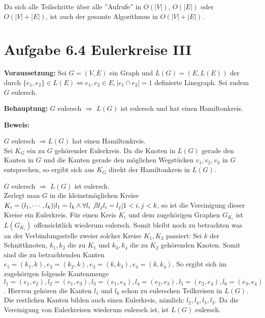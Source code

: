   Da sich alle Teilschritte über alle ''Aufrufe'' in $O(|V|)$, $O(|E|)$ oder $O(|V| + |E|)$, ist auch der gesamte Algorithmus in $O(|V| + |E|)$.
\clearpage
  \section*{Aufgabe 6.4 Eulerkreise III}
  
  \textbf{Voraussetzung: } Sei $G=(V,E)$ ein Graph und $L(G) = (E, L(E))$ der durch $\{e_1,e_2\} \in L(E) \Leftrightarrow e_1,e_2 \in E, |e_1 \cap e_2| = 1$ definierte Linegraph. Sei zudem $G$ eulersch.
  
  \noindent
  \textbf{Behauptung: } $G$ eulersch $\Rightarrow$ $L(G)$ ist eulersch und hat einen Hamiltonkreis.
  
  \noindent
  \textbf{Beweis:}
  
  $G$ eulersch $\Rightarrow L(G)$ hat einen Hamiltonkreis.\\
  
  Sei $K_G$ ein zu $G$ gehörender Eulerkreis. Da die Knoten in $L(G)$ gerade den Kanten in $G$ und die Kanten gerade den möglichen Wegstücken $v_1,v_2,v_3$ in $G$ entsprechen, so ergibt sich aus $K_G$ direkt der Hamiltonkreis in $L(G)$.
  
  $G$ eulersch $\Rightarrow$ $L(G)$ ist eulersch.\\

  Zerlegt man $G$ in die kleinstmöglichen Kreise 
  $K_i = (l_1, \cdots, l_k) | l_1 = l_k \wedge \forall l_i \not \exists l_j l_i = l_j | 1 < i,j < k$,
   so ist die Vereinigung dieser Kreise ein Eulerkreis. Für einen Kreis $K_i$ und dem zugehörigen Graphen $G_{K_i}$ ist $L(G_{K_i})$ offensichtlich wiederum eulersch. Somit bleibt noch zu betrachten was an der Verbindungsstelle zweier solcher Kreise $K_1, K_2$ passiert:  Sei $k$ der Schnittknoten, $k_1, k_2$ die zu $K_1$ und $k_3, k_4$ die zu $K_2$ gehörenden Knoten. Somit sind die zu betrachtenden Kanten $e_1 = (k_1, k), e_2 = (k_2, k), e_3 = (k, k_3), e_4 = (k, k_4)$. So ergibt sich im zugehörigen folgende Kantenmenge $l_1 = (e_1,e_2), l_2 = (e_1, e_3), l_3 = (e_1, e_4), l_4 = (e_2, e_3), l_5 = (e_2,e_4), l_6 = (e_3, e_4)$. Hiervon gehören die Kanten $l_1$ und $l_6$ schon zu eulerschen Teilkreisen in $L(G)$. Die restlichen Kanten bilden auch einen Eulerkreis, nämlich: $l_2, l_4, l_5, l_3$. Da die Vereinigung von Eulerkreisen wiederum eulersch ist, ist $L(G)$ eulersch.
  
  
  




